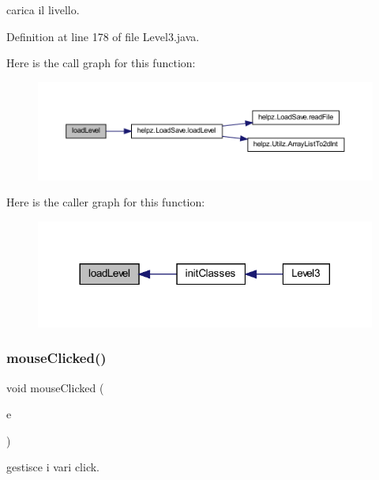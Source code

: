 carica il livello. 



Definition at line 178 of file Level3.\+java.

Here is the call graph for this function\+:\nopagebreak
\begin{figure}[H]
\begin{center}
\leavevmode
\includegraphics[width=350pt]{classscenes_1_1_level3_a286931cc46e197f4a85af7229fdc29a4_cgraph}
\end{center}
\end{figure}
Here is the caller graph for this function\+:\nopagebreak
\begin{figure}[H]
\begin{center}
\leavevmode
\includegraphics[width=317pt]{classscenes_1_1_level3_a286931cc46e197f4a85af7229fdc29a4_icgraph}
\end{center}
\end{figure}
\mbox{\label{classscenes_1_1_level3_a45d56bd84238e8b56589dfc732e2b2cf}} 
\subsubsection{\texorpdfstring{mouse\+Clicked()}{mouseClicked()}}
{\footnotesize\ttfamily void mouse\+Clicked (\begin{DoxyParamCaption}\item[{Mouse\+Event}]{e }\end{DoxyParamCaption})}



gestisce i vari click. 


